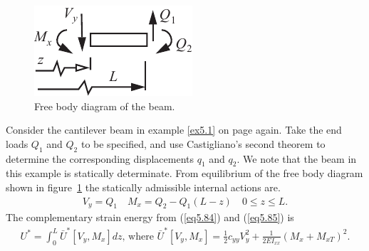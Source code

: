 \documentclass{AeroStructure-ERJohnson}
\begin{document}
\begin{example}\label{ex5.2}\setcounter{equation}{0}\def\theequation{\alph{equation}}

\begin{figure}
\vspace*{-19pt}
\includegraphics{Figure_5-12.pdf}
\caption{Free body diagram of the beam. \label{fig5.12}}
\end{figure}

\vspace*{-20pt}

\noindent Consider the cantilever beam in example \ref{ex5.1} on page \pageref{ex5.1} again. Take the end loads $Q_1$ and $Q_2$ to be specified, and use Castigliano's second theorem to determine the corresponding displacements $q_1$ and $q_2$. We note that the beam in this example is statically determinate. From equilibrium of the free body diagram shown in figure~\ref{fig5.12} the statically admissible internal actions are.
\begin{align}\label{ex5.2a}
V_{y}=Q_{1} \quad M_{x}=Q_{2}-Q_{1}(L-z) \quad 0 \leq z \leq L.
\end{align}
The complementary strain energy from (\ref{eq5.84}) and (\ref{eq5.85}) is
\begin{align}\label{ex5.2b}
U^{*}=\int_{0}^{L} \bar{U}^{*}\left[V_{y}, M_{x}\right] d z\mbox{, where }\bar{U}^{*}\left[V_{y}, M_{x}\right]=\frac{1}{2} c_{y y} V_{y}^{2}+\frac{1}{2 E I_{x x}}\left(M_{x}+M_{x T}\right)^{2}.
\end{align}

\clearpage



\end{example}
\end{document}
